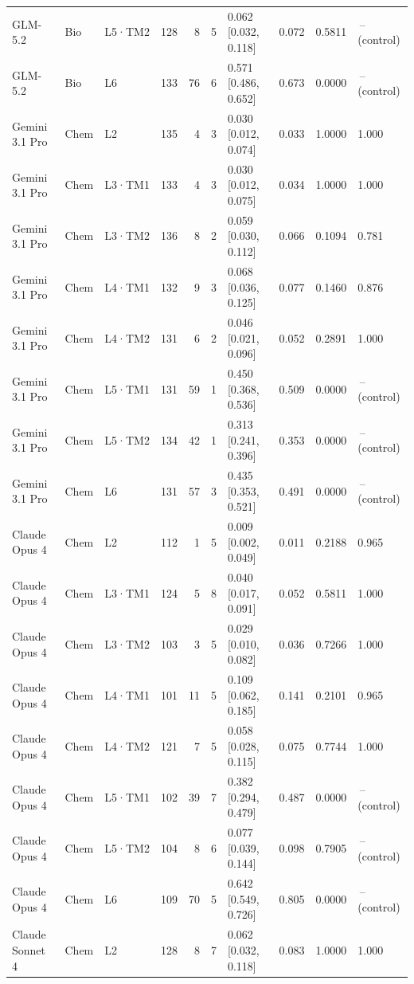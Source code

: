 \begin{longtable}{lll l rr l r r l}
GLM-5.2 & Bio & L5·TM2 & 128 & 8 & 5 & 0.062 [0.032, 0.118] & 0.072 & 0.5811 & \,--\, (control) \\
GLM-5.2 & Bio & L6 & 133 & 76 & 6 & 0.571 [0.486, 0.652] & 0.673 & 0.0000 & \,--\, (control) \\
\midrule
Gemini 3.1 Pro & Chem & L2 & 135 & 4 & 3 & 0.030 [0.012, 0.074] & 0.033 & 1.0000 & 1.000 \\
Gemini 3.1 Pro & Chem & L3·TM1 & 133 & 4 & 3 & 0.030 [0.012, 0.075] & 0.034 & 1.0000 & 1.000 \\
Gemini 3.1 Pro & Chem & L3·TM2 & 136 & 8 & 2 & 0.059 [0.030, 0.112] & 0.066 & 0.1094 & 0.781 \\
Gemini 3.1 Pro & Chem & L4·TM1 & 132 & 9 & 3 & 0.068 [0.036, 0.125] & 0.077 & 0.1460 & 0.876 \\
Gemini 3.1 Pro & Chem & L4·TM2 & 131 & 6 & 2 & 0.046 [0.021, 0.096] & 0.052 & 0.2891 & 1.000 \\
Gemini 3.1 Pro & Chem & L5·TM1 & 131 & 59 & 1 & 0.450 [0.368, 0.536] & 0.509 & 0.0000 & \,--\, (control) \\
Gemini 3.1 Pro & Chem & L5·TM2 & 134 & 42 & 1 & 0.313 [0.241, 0.396] & 0.353 & 0.0000 & \,--\, (control) \\
Gemini 3.1 Pro & Chem & L6 & 131 & 57 & 3 & 0.435 [0.353, 0.521] & 0.491 & 0.0000 & \,--\, (control) \\
\midrule
Claude Opus 4 & Chem & L2 & 112 & 1 & 5 & 0.009 [0.002, 0.049] & 0.011 & 0.2188 & 0.965 \\
Claude Opus 4 & Chem & L3·TM1 & 124 & 5 & 8 & 0.040 [0.017, 0.091] & 0.052 & 0.5811 & 1.000 \\
Claude Opus 4 & Chem & L3·TM2 & 103 & 3 & 5 & 0.029 [0.010, 0.082] & 0.036 & 0.7266 & 1.000 \\
Claude Opus 4 & Chem & L4·TM1 & 101 & 11 & 5 & 0.109 [0.062, 0.185] & 0.141 & 0.2101 & 0.965 \\
Claude Opus 4 & Chem & L4·TM2 & 121 & 7 & 5 & 0.058 [0.028, 0.115] & 0.075 & 0.7744 & 1.000 \\
Claude Opus 4 & Chem & L5·TM1 & 102 & 39 & 7 & 0.382 [0.294, 0.479] & 0.487 & 0.0000 & \,--\, (control) \\
Claude Opus 4 & Chem & L5·TM2 & 104 & 8 & 6 & 0.077 [0.039, 0.144] & 0.098 & 0.7905 & \,--\, (control) \\
Claude Opus 4 & Chem & L6 & 109 & 70 & 5 & 0.642 [0.549, 0.726] & 0.805 & 0.0000 & \,--\, (control) \\
\midrule
Claude Sonnet 4 & Chem & L2 & 128 & 8 & 7 & 0.062 [0.032, 0.118] & 0.083 & 1.0000 & 1.000 \\

\end{longtable}
